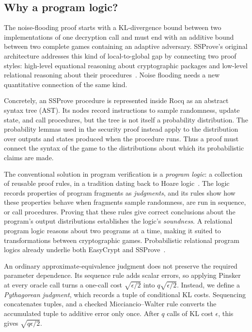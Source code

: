 \subsection{Why a program logic?}

The noise-flooding proof starts with a KL-divergence bound between two
implementations of one decryption call and must end with an additive bound
between two complete games containing an adaptive adversary.
SSProve's original architecture addresses this kind of local-to-global gap by
connecting two proof styles: high-level equational reasoning about
cryptographic packages and low-level relational reasoning about their
procedures~\cite{ssprove}.
Noise flooding needs a new quantitative connection of the same kind.

Concretely, an SSProve procedure is represented inside Rocq as an abstract
syntax tree (AST).
Its nodes record instructions to sample randomness, update state, and call
procedures, but the tree is not itself a probability distribution.
The probability lemmas used in the security proof instead apply to the
distribution over outputs and states produced when the procedure runs.
Thus a proof must connect the syntax of the game to the distributions about
which its probabilistic claims are made.

The conventional solution in program verification is a \emph{program logic}: a
collection of reusable proof rules, in a tradition dating back to Hoare
logic~\cite{hoare69}.
The logic records properties of program fragments as \emph{judgments}, and its
rules show how these properties behave when fragments sample randomness, are
run in sequence, or call procedures.
Proving that these rules give correct conclusions about the program's output distributions
establishes the logic's \emph{soundness}.
A relational program logic reasons about two programs at a time, making it
suited to transformations between cryptographic games.
Probabilistic relational program logics already underlie both EasyCrypt and
SSProve~\cite{easycrypt,ssprove}.

An ordinary approximate-equivalence judgment does not preserve the required parameter dependence.
Its sequence rule adds scalar errors, so applying Pinsker at every oracle call turns a one-call cost \(\sqrt{\epsilon/2}\) into \(q\sqrt{\epsilon/2}\).
Instead, we define a \emph{Pythagorean judgment}, which records a tuple of conditional KL costs.
Sequencing concatenates tuples, and a checked Micciancio--Walter rule converts the accumulated tuple to additive error only once.
After \(q\) calls of KL cost \(\epsilon\), this gives \(\sqrt{q\epsilon/2}\).


